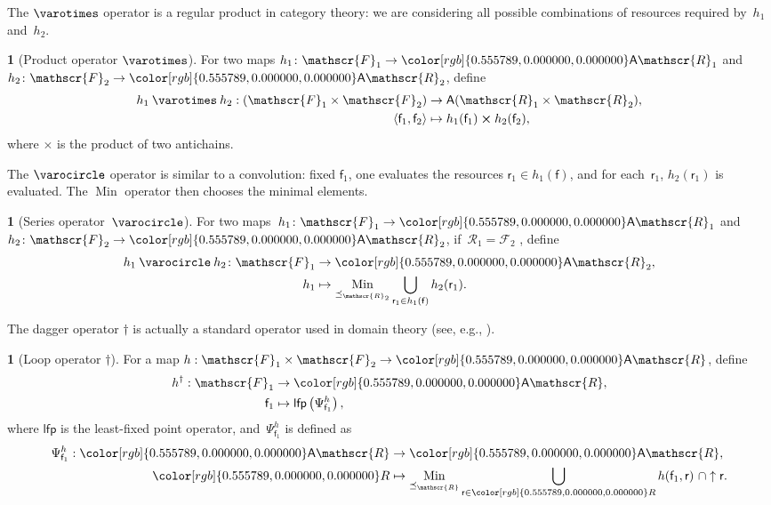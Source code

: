 \documentclass[twocolumn,english]{IEEEconf}
\theoremstyle{plain}
\theoremstyle{definition}
\theoremstyle{definition}
\newtheorem{defn}[thm]{\protect\definitionname}
\theoremstyle{plain}
\newcommand{\aword}[1]{\mathsf{#1}}
\newcommand{\vmath}[1]{\aword{#1}}
\DeclareMathOperator*{\Min}{Min}
\newcommand{\posleq}{\preceq}
\newcommand{\lfp}{\vmath{lfp}}
\newcommand{\antichains}{\vmath{A}}
\newcommand{\ftor}{{h}}
\newcommand{\funsp}{\mathscr{F}}
\newcommand{\fun}{\vmath{f}}
\newcommand{\res}{\vmath{r}}
\newcommand{\ressp}{\mathscr{R}}
\newcommand{\Aressp}{{\antichains\ressp}}
\newcommand{\acprod}{\mathbin{\boldsymbol{\times}}}
\newcommand{\oploop}{\dagger}
\newcommand{\opseries}{\mathbin{\varocircle}}
\newcommand{\oppar}{\mathbin{\varotimes}}
\newcommand{\colR}{\color[rgb]{0.555789,0.000000,0.000000}}
\renewcommand{\Aressp}{{\colR\antichains\ressp}}
\providecommand{\definitionname}{Definition}
\begin{document}
The $\oppar$ operator is a regular product in category theory: we
are considering all possible combinations of resources required by~$\ftor_{1}$
and~$\ftor_{2}$.
\begin{defn}[Product operator $\oppar$]
\label{def:opmaps}For two maps $\ftor_{1}\colon\funsp_{1}\rightarrow\Aressp_{1}$
and $\ftor_{2}\colon\funsp_{2}\rightarrow\Aressp_{2}$, define
\begin{align*}
\ftor_{1}\oppar\ftor_{2}:(\funsp_{1}\times\funsp_{2}) & \rightarrow\antichains(\ressp_{1}\times\ressp_{2}),\\
\left\langle \fun_{1},\fun_{2}\right\rangle  & \mapsto\ftor_{1}(\fun_{1})\acprod\ftor_{2}(\fun_{2}),
\end{align*}
where $\acprod$ is the product of two antichains.
\end{defn}
The $\opseries$ operator is similar to a convolution: fixed $\fun_{1}$,
one evaluates the resources $\res_{1}\in\ftor_{1}(\fun)$, and for
each~$\res_{1}$, $\ftor_{2}(\res_{1})$ is evaluated. The $\Min$
operator then chooses the minimal elements.
\begin{defn}[Series operator~$\opseries$]
\label{def:opseries}For two maps~$\ftor_{1}\colon\funsp_{1}\rightarrow\Aressp_{1}$
and~$\ftor_{2}\colon\funsp_{2}\rightarrow\Aressp_{2}$, if~$\ressp_{1}=\funsp_{2}$
, define
\begin{align*}
{\displaystyle \ftor_{1}\opseries\ftor_{2}\colon\funsp_{1}} & \rightarrow\Aressp_{2},\\
\ftor_{1} & \mapsto\Min_{\posleq_{\ressp_{2}}}\bigcup_{\res_{1}\in\ftor_{1}(\fun)}\ftor_{2}(\res_{1}).
\end{align*}

\end{defn}


The dagger operator $\oploop$ is actually a standard operator used
in domain theory (see, e.g., \cite[II-2.29]{gierz03continuous}).
\begin{defn}[Loop operator $\oploop$]
\label{def:oploop}For a map $\ftor:\funsp_{1}\times\funsp_{2}\rightarrow\Aressp$,
define
\begin{align}
\ftor^{\oploop}:\funsp_{1} & \rightarrow\Aressp,\nonumber \\
\fun_{1} & \mapsto\lfp\left(\Psi_{\fun_{1}}^{\ftor}\right),\label{eq:lfp}
\end{align}
where $\lfp$ is the least-fixed point operator, and~$\Psi_{\fun_{1}}^{\ftor}$
is defined as
\begin{align*}
\Psi_{\fun_{1}}^{\ftor}:\Aressp & \rightarrow\Aressp,\\
{\colR R} & \mapsto\Min_{\posleq_{\ressp}}\bigcup_{\res\in{\colR R}}\ftor(\fun_{1},\res)\ \cap\uparrow\res.
\end{align*}
\end{defn}
\end{document}
